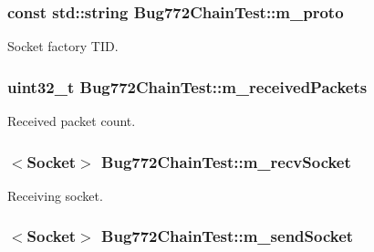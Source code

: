 \subsubsection[{\texorpdfstring{m\+\_\+proto}{m_proto}}]{\setlength{\rightskip}{0pt plus 5cm}const std\+::string Bug772\+Chain\+Test\+::m\+\_\+proto\hspace{0.3cm}{\ttfamily [private]}}\hypertarget{classBug772ChainTest_a107f53a666f3b0c5e7d3065d56bac5e2}{}\label{classBug772ChainTest_a107f53a666f3b0c5e7d3065d56bac5e2}


Socket factory T\+ID. 

\subsubsection[{\texorpdfstring{m\+\_\+received\+Packets}{m_receivedPackets}}]{\setlength{\rightskip}{0pt plus 5cm}uint32\+\_\+t Bug772\+Chain\+Test\+::m\+\_\+received\+Packets\hspace{0.3cm}{\ttfamily [private]}}\hypertarget{classBug772ChainTest_af3610211c4be36edd070e6359c33bcca}{}\label{classBug772ChainTest_af3610211c4be36edd070e6359c33bcca}


Received packet count. 

\subsubsection[{\texorpdfstring{m\+\_\+recv\+Socket}{m_recvSocket}}]{$<${\bf Socket}$>$ Bug772\+Chain\+Test\+::m\+\_\+recv\+Socket\hspace{0.3cm}{\ttfamily [private]}}\hypertarget{classBug772ChainTest_a4d3a3e78853e99307c08276bac5d7ece}{}\label{classBug772ChainTest_a4d3a3e78853e99307c08276bac5d7ece}


Receiving socket. 

\subsubsection[{\texorpdfstring{m\+\_\+send\+Socket}{m_sendSocket}}]{$<${\bf Socket}$>$ Bug772\+Chain\+Test\+::m\+\_\+send\+Socket\hspace{0.3cm}{\ttfamily [private]}}\hypertarget{classBug772ChainTest_aa38ac9d2ddc0693c530652565e3657d9}{}\label{classBug772ChainTest_aa38ac9d2ddc0693c530652565e3657d9}



